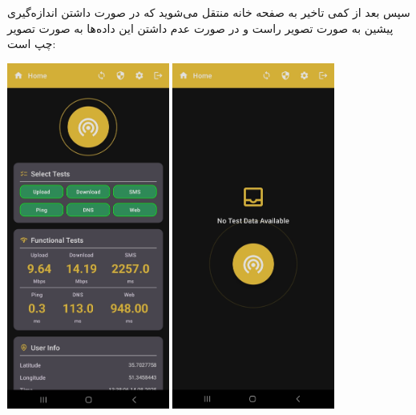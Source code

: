 \begin{itemize}
\begin{center}
		\end{center}
		سپس بعد از کمی تاخیر به صفحه خانه منتقل می‌شوید که در صورت داشتن اندازه‌گیری پیشین به صورت تصویر راست و در صورت عدم داشتن این داده‌ها به صورت تصویر چپ است:
		\begin{center}
			\includegraphics[width=0.4\textwidth]{images/home-filled.jpg}
			\includegraphics[width=0.4\textwidth]{images/home-empty.jpg}
		\end{center}
		

\end{itemize}
